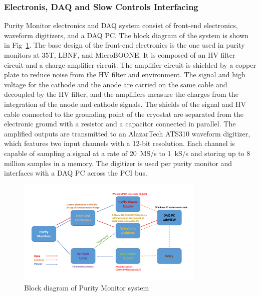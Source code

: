 

\subsubsection{Electronis, DAQ and Slow Controls Interfacing}

Purity Monitor electronics and DAQ system consist of front-end electronics, waveform digitizers, and a DAQ PC. The block diagram of the system is shown in Fig~\ref{fig:diagram}. The base design of the front-end electronics is the one used in purity monitors at 35T, LBNF, and MicroBOONE. It is composed of an HV filter circuit and a charge amplifier circuit. The amplifier circuit is shielded by a copper plate to reduce noise from the HV filter and environment. The signal and high voltage for the cathode and the anode are carried on the same cable and decoupled by the HV filter, and the amplifiers measure the charges from the integration of the anode and cathode signals. The shields of the signal and HV cable connected to the grounding point of the cryostat are separated from the electronic ground with a resistor and a capacitor connected in parallel. The amplified outputs are transmitted to an AlazarTech ATS310 waveform digitizer, which features two input channels with a 12-bit resolution. Each channel is capable of sampling a signal at a rate of 20~MS/s to 1~kS/s and storing up to 8 million samples in a memory. The digitizer is used per purity monitor and interfaces with a DAQ PC across the PCI bus.


\begin{figure}[h]
	\centering
	\includegraphics[width=0.8\textwidth]{figures/PrMon_BlockDiagram.pdf}
	\caption{Block diagram of Purity Monitor system}
	\label{fig:diagram}
\end{figure}


